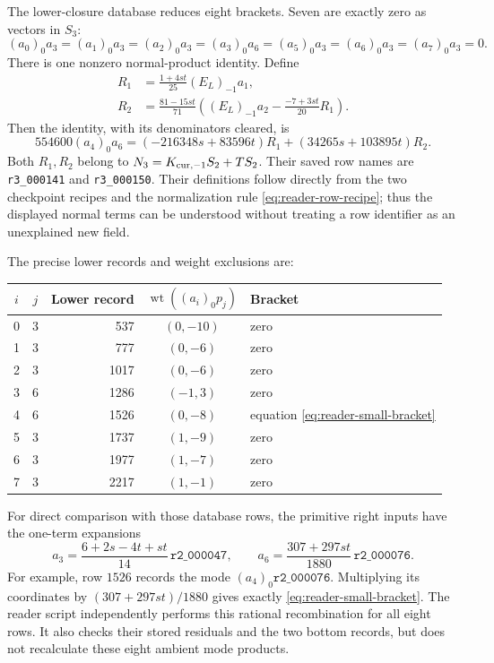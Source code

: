 The lower-closure database reduces eight brackets.  Seven are
exactly zero as vectors in $S_3$:
\begin{equation}\label{eq:reader-seven-zeros}
 (a_0)_0a_3=(a_1)_0a_3=(a_2)_0a_3=(a_3)_0a_6
          =(a_5)_0a_3=(a_6)_0a_3=(a_7)_0a_3=0.
\end{equation}
There is one nonzero normal-product identity.  Define
\begin{align*}
 R_1&=\frac{1+4st}{25}(E_L)_{-1}a_1,\\
 R_2&=\frac{81-15st}{71}
           \left((E_L)_{-1}a_2-\frac{-7+3st}{20}R_1\right).
\end{align*}
Then the identity, with its denominators cleared, is
\begin{equation}\label{eq:reader-small-bracket}
 554600(a_4)_0a_6
       =(-216348s+83596t)R_1+(34265s+103895t)R_2.
\end{equation}
Both $R_1,R_2$ belong to $N_3=K_{{\rm cur},-1}S_2+TS_2$.
Their saved row names are \texttt{r3\_000141} and
\texttt{r3\_000150}.  Their definitions follow directly from
the two checkpoint recipes and the normalization rule
\eqref{eq:reader-row-recipe}; thus the displayed normal terms can
be understood without treating a row identifier as an unexplained
new field.

The precise lower records and weight exclusions are:
\begin{center}
\begin{tabular}{ccrcl}
\toprule
$i$&$j$&Lower record&$\operatorname{wt}((a_i)_0p_j)$&Bracket\\
\midrule
0&3&537&$(0,-10)$&zero\\
1&3&777&$(0,-6)$&zero\\
2&3&1017&$(0,-6)$&zero\\
3&6&1286&$(-1,3)$&zero\\
4&6&1526&$(0,-8)$&equation \eqref{eq:reader-small-bracket}\\
5&3&1737&$(1,-9)$&zero\\
6&3&1977&$(1,-7)$&zero\\
7&3&2217&$(1,-1)$&zero\\
\bottomrule
\end{tabular}
\end{center}
For direct comparison with those database rows, the primitive
right inputs have the one-term expansions
\[
 a_3=\frac{6+2s-4t+st}{14}\,\texttt{r2\_000047},
 \qquad
 a_6=\frac{307+297st}{1880}\,\texttt{r2\_000076}.
\]
For example, row $1526$ records the mode
$(a_4)_0\texttt{r2\_000076}$.  Multiplying its coordinates by
$(307+297st)/1880$ gives exactly
\eqref{eq:reader-small-bracket}.  The reader script independently
performs this rational recombination for all eight rows.  It
also checks their stored residuals and the two bottom records,
but does not recalculate these eight ambient mode products.

